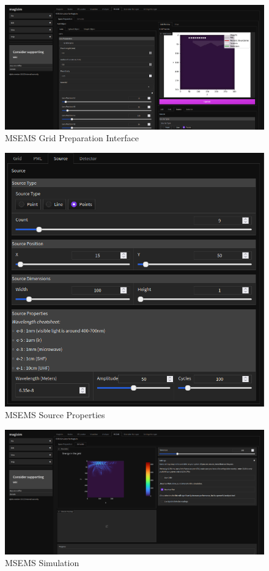 \documentclass[11pt, a4paper, titlepage]{article}
\begin{document}
\begin{figure}[h]
	\includegraphics[width=\textwidth]{magisim-screenshot-0005.png}
	\caption{MSEMS Grid Preparation Interface}
	\label{fig:msemsgridprep}
\end{figure}
\newpage
\begin{figure}[h]
	\includegraphics[width=\textwidth]{magisim-screenshot-0006.png}
	\caption{MSEMS Source Properties}
	\label{fig:msemsgridprops}
\end{figure}
\newpage
\begin{figure}[h]
	\includegraphics[width=\textwidth]{magisim-screenshot-0007.png}
	\caption{MSEMS Simulation}
	\label{fig:msemssim}
\end{figure}
\end{document}
